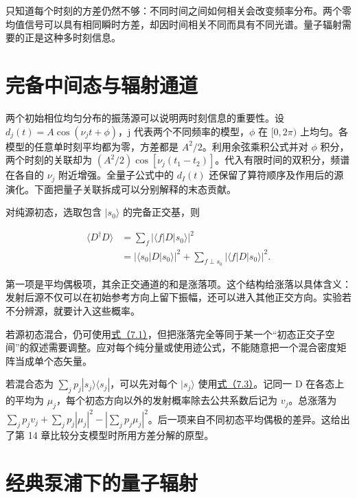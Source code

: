 \documentclass[UTF8,a4paper,zihao=-4,openany,fontset=fandol]{ctexbook}
\begin{document}
只知道每个时刻的方差仍然不够：不同时间之间如何相关会改变频率分布。两个零均值信号可以具有相同瞬时方差，却因时间相关不同而具有不同光谱。量子辐射需要的正是这种多时刻信息。



\section{完备中间态与辐射通道}\label{sec:07:4}


两个初始相位均匀分布的振荡源可以说明两时刻信息的重要性。设 $d_j(t)=A\cos(\nu_j t+\phi)$，j 代表两个不同频率的模型，$\phi$ 在 $[0,2\pi)$ 上均匀。各模型的任意单时刻平均都为零，方差都是 $A^2/2$。利用余弦乘积公式并对 $\phi$ 积分，两个时刻的关联却为 $(A^2/2)\cos[\nu_j(t_1-t_2)]$。代入有限时间的双积分，频谱在各自的 $\nu_j$ 附近增强。全量子公式中的 $d_I(t)$ 还保留了算符顺序及作用后的源演化。下面把量子关联拆成可以分别解释的末态贡献。



对纯源初态，选取包含 $|s_0\rangle$ 的完备正交基，则



\begin{equation*}
\begin{aligned}
\langle D^\dagger D\rangle
&=\sum_f|\langle f|D|s_0\rangle|^2\\
&=|\langle s_0|D|s_0\rangle|^2
+\sum_{f\perp s_0}|\langle f|D|s_0\rangle|^2.
\end{aligned}
\tag{7.3}\label{eq:7.3}
\end{equation*}


第一项是平均偶极项，其余正交通道的和是涨落项。这个结构给涨落以具体含义：发射后源不仅可以在初始参考方向上留下振幅，还可以进入其他正交方向。实验若不分辨源，就要计入这些概率。



若源初态混合，仍可使用\hyperref[eq:7.1]{式（7.1）}，但把涨落完全等同于某一个“初态正交子空间”的叙述需要调整。应对每个纯分量或使用迹公式，不能随意把一个混合密度矩阵当成单个态矢量。



若混合态为 $\sum_j p_j|s_j\rangle\langle s_j|$，可以先对每个 $|s_j\rangle$ 使用\hyperref[eq:7.3]{式（7.3）}。记同一 D 在各态上的平均为 $\mu_j$，每个初态方向以外的发射概率除去公共系数后记为 $v_j$。总涨落为 $\sum_j p_j v_j+\sum_jp_j|\mu_j|^2-|\sum_jp_j\mu_j|^2$。后一项来自不同初态平均偶极的差异。这给出了第 14 章比较分支模型时所用方差分解的原型。



\section{经典泵浦下的量子辐射}\label{sec:07:5}
\end{document}
